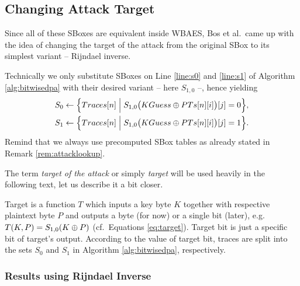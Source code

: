 
\subsection{Changing Attack Target}
\label{sec:rijinv}

Since all of these SBoxes are equivalent inside WBAES, Bos et al.\ came up with the idea of changing the target of the attack from the original SBox to its simplest variant -- Rijndael inverse.

\begin{remark}
\label{rem:spq}
	Technically we only substitute SBoxes on Line \ref{line:s0} and \ref{line:s1} of Algorithm \ref{alg:bitwisedpa} with their desired variant -- here $S_{1,0}$ --, hence yielding
	\begin{align}
	\begin{split}
	\label{eq:target}
		S_0 &\gets \Bigl\{ Traces[n] \Bigm| S_{1,0}\bigl(KGuess\oplus PTs[n][i]\bigr)[j] = 0 \Bigr\} , \\
		S_1 &\gets \Bigl\{ Traces[n] \Bigm| S_{1,0}\bigl(KGuess\oplus PTs[n][i]\bigr)[j] = 1 \Bigr\} .
	\end{split}
	\end{align}
	Remind that we always use precomputed SBox tables as already stated in Remark \ref{rem:attacklookup}.
\end{remark}

\begin{note}
\label{note:target}
	The term {\em target of the attack} or simply {\em target} will be used heavily in the following text, let us describe it a bit closer.
	
	Target is a function $T$ which inputs a key byte $K$ together with respective plaintext byte $P$ and outputs a byte (for now) or a single bit (later), e.g.\ $T(K,P) = S_{1,0}(K\oplus P)$ (cf.\ Equations \ref{eq:target}). Target bit is just a specific bit of target's output. According to the value of target bit, traces are split into the sets $S_0$ and $S_1$ in Algorithm \ref{alg:bitwisedpa}, respectively.
\end{note}

\subsubsection{Results using Rijndael Inverse}
	
